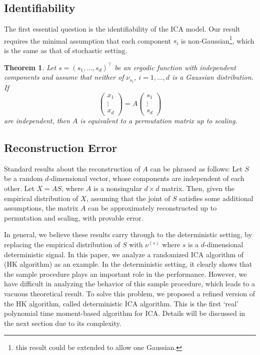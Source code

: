 \documentclass[twoside]{article}
\newcommand{\xcom}[1]{x_{#1}}
\newcommand{\scom}[1]{s_{#1}}
\newtheorem{thm}[lemma]{Theorem}
\theoremstyle{definition}
\begin{document}
\subsection{Identifiability}
\label{subsec:Indentifiability}
The first essential question is the identifiability of the ICA model.
Our result requires the minimal assumption that each component $s_i$ is non-Gaussian\footnote{this result could be extended to allow one Gaussian.}, which is the same as that of stochastic setting.
\begin{thm}
\label{thm:CorofICA}
Let $s = (\scom{1},\ldots,\scom{d})^{\top}$ be an ergodic function with independent components and
assume that neither of $\nu_{\scom{i}}$, $i=1,\ldots,d$ is a Gaussian distribution. If
\begin{equation}
\left(
\begin{array}{ccc}
\xcom{1} \\
\vdots \\
\xcom{d}
\end{array}
\right) = A
\left(
\begin{array}{ccc}
\scom{1} \\
\vdots \\
\scom{d}
\end{array}
\right)
\end{equation}
are independent, then $A$ is equivalent to a permutation matrix up to scaling.
\end{thm}

\subsection{Reconstruction Error}
\label{subsec:HowDifficult}

Standard results about the reconstruction of $A$ can be phrased as follows:
Let $S$ be a random $d$-dimensional vector, whose components are independent of each other.
Let $X = A S$, where $A$ is a nonsingular $d\times d$ matrix. Then, given the empirical distribution of $X$, assuming that the joint of $S$ satisfies some additional assumptions, the matrix $A$ can be approximately reconstructed up to permutation and scaling, with provable error.

In general, we believe these results carry through to the deterministic setting, by replacing the empirical distribution of $S$ with $\nu^{(s)}$ where $s$ is a $d$-dimensional deterministic signal.
In this paper, we analyze a randomized ICA algorithm of \citep{DHsu2012}(HK algorithm) as an example. 
In the deterministic setting, it clearly shows that the sample procedure plays an important role in the performance.
However, we have difficult in analyzing the behavior of this sample procedure, which leads to a vacuous theoretical result.
To solve this problem, we proposed a refined version of the HK algorithm, called deterministic ICA algorithm. 
This is the first `real' polynomial time moment-based algorithm for ICA. 
Details will be discussed in the next section due to its complexity.  
\fi
\end{document}

